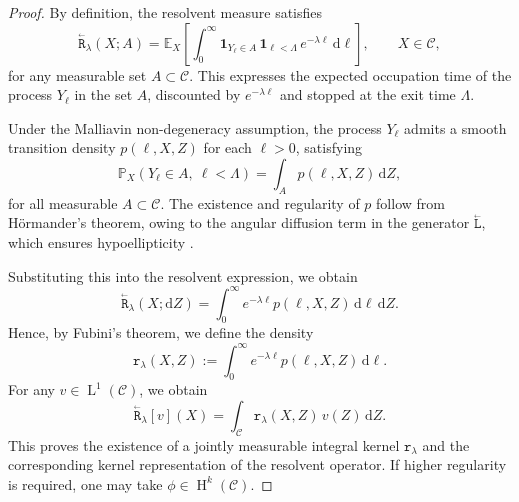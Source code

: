 \documentclass{amsart}
\newcommand{\dd}{{\mathrm d}}
\newcommand{\sobh}[1]{{\ensuremath{\operatorname H}^{#1}}}
\newcommand{\bL}{\stackrel{_\leftarrow}{\mathtt L}}
\newcommand{\bR}{\stackrel{_\leftarrow}{\mathtt R}}
\newcommand{\rr}{{\mathtt r}}
\theoremstyle{plain}
\newcommand{\leb}{\text{Leb}}
\newcommand{\LL}{\ensuremath{\operatorname L}\xspace}
\renewcommand{\leb}[1]{\ensuremath{\LL^{#1}}}
\begin{document}
\begin{proof}
  By definition, the resolvent measure satisfies
  \begin{equation}
    \bR_\lambda(X; A)
    =
    \mathbb{E}_{X} \left[ \int_0^\infty \mathbf{1}_{Y_\ell \in A} \, \mathbf{1}_{\ell < \Lambda} \, e^{-\lambda \ell} \, \dd \ell \right], \qquad X \in \mathcal{C},
  \end{equation}
  for any measurable set $A \subset \mathcal{C}$. This expresses the
  expected occupation time of the process $Y_\ell$ in the set $A$,
  discounted by $e^{-\lambda \ell}$ and stopped at the exit time
  $\Lambda$.

  Under the Malliavin non-degeneracy assumption, the process $Y_\ell$
  admits a smooth transition density $p(\ell, X, Z)$ for each $\ell >
  0$, satisfying
  \begin{equation}
    \mathbb{P}_X(Y_\ell \in A,~ \ell < \Lambda) = \int_A p(\ell, X, Z) \, \dd Z,
  \end{equation}
  for all measurable $A \subset \mathcal{C}$. The existence and
  regularity of $p$ follow from H\"ormander's theorem, owing to the
  angular diffusion term in the generator $\bL$, which ensures
  hypoellipticity \cite{hormander1967hypoelliptic,
    bismut1981martingales}.

  Substituting this into the resolvent expression, we obtain
  \begin{equation}
    \bR_\lambda(X; \dd Z) 
    = \int_0^\infty e^{-\lambda \ell} p(\ell, X, Z) \, \dd \ell \, \dd Z.
  \end{equation}
  Hence, by Fubini’s theorem, we define the density
  \begin{equation}
    \rr_\lambda(X, Z) := \int_0^\infty e^{-\lambda \ell} p(\ell, X, Z) \, \dd \ell.
  \end{equation}
  For any $v \in \leb{1}(\mathcal{C})$, we obtain
  \begin{equation}
    \bR_\lambda[v](X) = \int_{\mathcal{C}} \rr_\lambda(X, Z) \, v(Z) \, \dd Z.
  \end{equation}
  This proves the existence of a jointly measurable integral kernel
  $\rr_\lambda$ and the corresponding kernel representation of the
  resolvent operator. If higher regularity is required, one may take
  $\phi \in \sobh{k}(\mathcal{C})$.
\end{proof}
\end{document}
